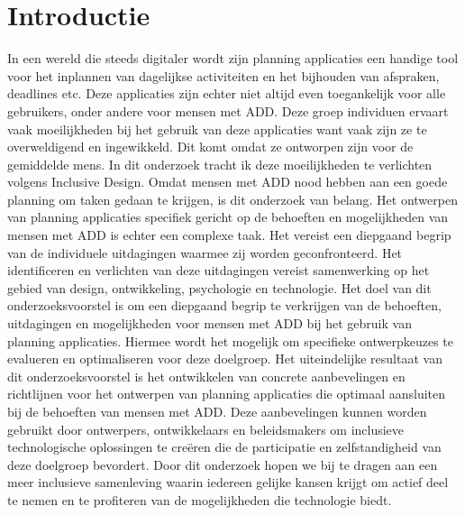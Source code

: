
\section{Introductie}%
\label{sec:introductie}
In een wereld die steeds digitaler wordt zijn planning applicaties een handige tool voor het inplannen van dagelijkse activiteiten en het bijhouden van afspraken, deadlines etc. Deze applicaties zijn echter niet altijd even toegankelijk voor alle gebruikers, onder andere voor mensen met ADD. Deze groep individuen ervaart vaak moeilijkheden bij het gebruik van deze applicaties want vaak zijn ze te overweldigend en ingewikkeld. Dit komt omdat ze ontworpen zijn voor de gemiddelde mens. In dit onderzoek tracht ik deze moeilijkheden te verlichten volgens Inclusive Design. Omdat mensen met ADD nood hebben aan een goede planning om taken gedaan te krijgen, is dit onderzoek van belang. \newline \newline
Het ontwerpen van planning applicaties specifiek gericht op de behoeften en mogelijkheden van mensen met ADD is echter een complexe taak. Het vereist een diepgaand begrip van de individuele uitdagingen waarmee zij worden geconfronteerd. Het identificeren en verlichten van deze uitdagingen vereist samenwerking op het gebied van design, ontwikkeling, psychologie en technologie. \newline \newline
Het doel van dit onderzoeksvoorstel is om een diepgaand begrip te verkrijgen van de behoeften, uitdagingen en mogelijkheden voor mensen met ADD bij het gebruik van planning applicaties. Hiermee wordt het mogelijk om specifieke ontwerpkeuzes te evalueren en optimaliseren voor deze doelgroep. \newline \newline
Het uiteindelijke resultaat van dit onderzoeksvoorstel is het ontwikkelen van concrete aanbevelingen en richtlijnen voor het ontwerpen van planning applicaties die optimaal aansluiten bij de behoeften van mensen met ADD. Deze aanbevelingen kunnen worden gebruikt door ontwerpers, ontwikkelaars en beleidsmakers om inclusieve technologische oplossingen te creëren die de participatie en zelfstandigheid van deze doelgroep bevordert.
Door dit onderzoek hopen we bij te dragen aan een meer inclusieve samenleving waarin iedereen gelijke kansen krijgt om actief deel te nemen en te profiteren van de mogelijkheden die technologie biedt.


